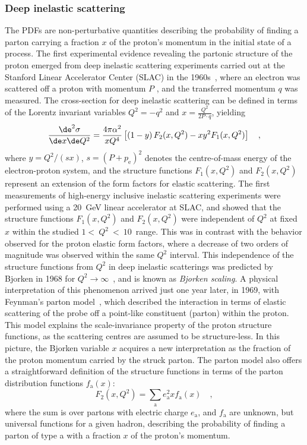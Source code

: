 \subsubsection{Deep inelastic scattering}
The PDFs are non-perturbative quantities describing the probability of finding a parton carrying a fraction $x$ of the proton's momentum in the initial state of a process. The first experimental evidence revealing the partonic structure of the proton emerged from deep inelastic scattering experiments carried out at the Stanford Linear Accelerator Center (SLAC) in the 1960s~\cite{Friedman:1972sy}, where an electron was scattered off a proton with momentum $P$
, and the transferred momentum $q$ was measured. The cross-section for deep inelastic scattering can be defined in terms of the Lorentz invariant variables $Q^2 = -q^2$ and $x = \frac{Q^2}{2P\cdot q}$, yielding
\begin{equation*}
    \frac{\de^2\sigma}{\de x \de Q^2} = \frac{4\pi\alpha^2}{xQ^4} \left[ \left(1-y\right)F_2(x,Q^2) - xy^2F_1(x,Q^2) \right]\quad ,
\end{equation*}
where $y=Q^2/(sx)$, $s = (P+p_\mathrm{e})^2$ denotes the centre-of-mass energy of the electron-proton system, and the structure functions $F_1(x,Q^2)$ and $F_2(x,Q^2)$ represent an extension of the form factors for elastic scattering.
The first measurements of high-energy inclusive inelastic scattering experiments were performed using a 20~GeV linear accelerator at SLAC, and showed that the structure functions $F_1(x,Q^2)$ and $F_2(x,Q^2)$ were independent of $Q^2$ at fixed $x$ within the studied $1<~Q^2~<~10$~\gevcc range. This was in contrast with the behavior observed for the proton elastic form factors, where a decrease of two orders of magnitude was observed within the same $Q^2$ interval. This independence of the structure functions from $Q^2$ in deep inelastic scatterings was predicted by Bjorken in 1968 for $Q^2 \rightarrow \infty$~\cite{Bjorken:1968dy}, and is known as \emph{Bjorken scaling}. A physical interpretation of this phenomenon arrived just one year later, in 1969, with Feynman's parton model~\cite{Feynman:1969ej}, which described the interaction in terms of elastic scattering of the probe off a point-like constituent (parton) within the proton. This model explains the scale-invariance property of the proton structure functions, as the scattering centres are assumed to be structure-less. In this picture, the Bjorken variable $x$ acquires a new interpretation as the fraction of the proton momentum carried by the struck parton. The parton model also offers a straightforward definition of the structure functions in terms of the parton distribution functions $f_\mathrm{a}(x)$:
\begin{equation*}
    F_2(x,Q^2) = \sum_\mathrm{a} e_\mathrm{a}^2 x f_\mathrm{a}(x)\quad ,
\end{equation*}
where the sum is over partons with electric charge $e_\mathrm{a}$, and $f_\mathrm{a}$ are unknown, but universal functions for a given hadron, describing the probability of finding a parton of type a with a fraction $x$ of the proton's momentum. 

